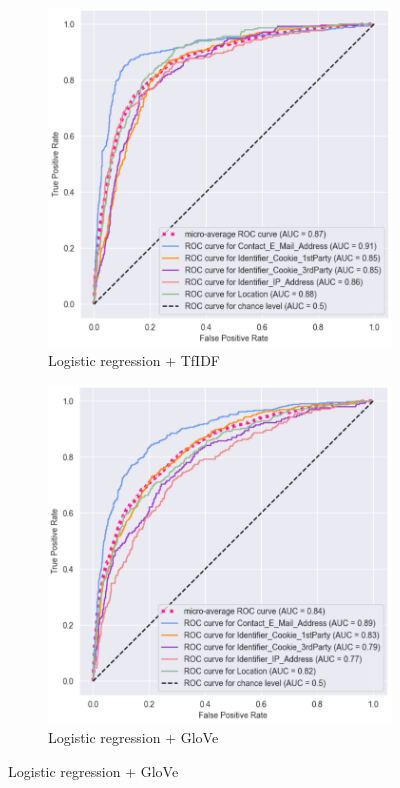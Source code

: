 \begin{figure}[!ht]
	\begin{subfigure}[t]{.5\textwidth}
	  \centering
	  \includegraphics[width=\linewidth]{figures/roc_logistic_tfidf.png}
	  \caption{Logistic regression + TfIDF}
	\end{subfigure}
	\hfill
	\begin{subfigure}[t]{.5\textwidth}
	  \centering
	  \includegraphics[width=\linewidth]{figures/roc_logistic_glove.png}
	  \caption{Logistic regression + GloVe}
	\end{subfigure}
	

\end{figure}
